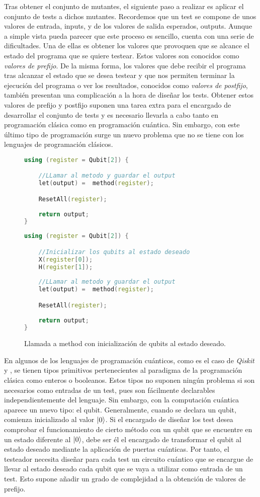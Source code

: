 Tras obtener el conjunto de mutantes, el siguiente paso a realizar es aplicar el conjunto de tests a dichos mutantes. Recordemos que un test se compone  de unos valores de entrada, inputs, y de los  valores de salida esperados, outputs. 
%
Aunque a simple vista pueda parecer que este proceso es sencillo, cuenta con una serie de dificultades. Una de ellas es obtener los valores que provoquen que se alcance el estado del programa que se quiere testear. Estos valores son conocidos como \emph{valores de prefijo}. De la misma forma, los valores que debe recibir el programa tras alcanzar el estado que se desea testear y que nos permiten terminar la ejecución del programa o ver los resultados, conocidos como \emph{valores de postfijo}, también presentan una complicación a la hora de diseñar los tests. Obtener estos valores de prefijo y postfijo suponen una tarea extra para el encargado de desarrollar el conjunto de tests y es necesario llevarla a cabo tanto en programación clásica como en programación cuántica. Sin embargo, con este último tipo de programación surge un nuevo problema que no se tiene con los lenguajes de programación clásicos.
\begin{figure}[htb!]
\begin{lstlisting}[language=c++]
using (register = Qubit[2]) {

	//LLamar al metodo y guardar el output
	let(output) =  method(register);

	ResetAll(register);
	
	return output;
}
\end{lstlisting}
\begin{lstlisting}[language=c++]
using (register = Qubit[2]) {

	//Inicializar los qubits al estado deseado
	X(register[0]);
	H(register[1]);
	
	//LLamar al metodo y guardar el output
	let(output) =  method(register);

	ResetAll(register);
	
	return output;
}
\end{lstlisting}
\caption{Llamada a method con inicialización de qubits al estado deseado.}
\label{fig:code42}
\end{figure}

En algunos de los lenguajes de programación cuánticos, como es el caso de \textit{Qiskit} y \qsh, se tienen tipos primitivos pertenecientes al paradigma de la programación clásica como enteros o booleanos. Estos tipos no suponen ningún problema si son necesarios como entradas de un test, pues son fácilmente declarables independientemente del lenguaje. Sin embargo, con la computación cuántica aparece un nuevo tipo: el qubit. 
%
Generalmente, cuando se declara un qubit, comienza inicializado al valor $\left|0\right\rangle$. Si el encargado de diseñar los test desea comprobar el funcionamiento de cierto método con un qubit que se encuentre en un estado diferente al $\left|0\right\rangle$, debe ser él el encargado de transformar el qubit al estado deseado mediante la aplicación de puertas cuánticas. Por tanto, el testeador necesita diseñar para cada test un circuito cuántico que se encargue de llevar al estado deseado cada qubit que se vaya a utilizar como entrada de un test. Esto supone añadir un grado de complejidad a la obtención de valores de prefijo.

